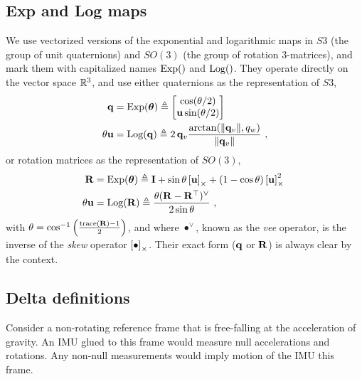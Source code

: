 \subsection{Exp and Log maps}

We use vectorized versions of the exponential and logarithmic maps in $S3$ (the group of unit quaternions) and $SO(3)$ (the group of rotation 3-matrices), and mark them with capitalized names $\operatorname*{Exp}()$ and $\operatorname*{Log}()$. They operate directly on the vector space ${\mathbb R}^3$, and use either quaternions as the representation of $S3$,
%
\begin{subequations}
\begin{align}
{\bf q}
&= \operatorname*{Exp}({{\bm \theta}}) \triangleq \begin{bmatrix}
\cos(\theta/2) \\ {\bf u}\sin(\theta/2)
\end{bmatrix}\\ 
\theta{\bf u} &= \operatorname*{Log}({\bf q}) \triangleq 2\,{{\bf q}_v}\frac{\arctan({{\left\|{{\bf q}_v}\right\|},q_w})}{{\left\|{{\bf q}_v}\right\|}}
~,
\end{align}
\end{subequations}
%
or rotation matrices as the representation of $SO(3)$, 
%
\begin{subequations}
\begin{align}
{\bf R}
&= \operatorname*{Exp}({{\bm \theta}}) \triangleq {\bf I} + \sin\theta\left[{\bf u}\right]_\times + (1-\cos\theta)\left[{\bf u}\right]_\times^2~ \label{equ:rodrigues} \\ 
\theta{\bf u} &= \operatorname*{Log}({\bf R}) \triangleq \frac{\theta({\bf R}-{\bf R}^{\top})^\vee}{2\sin\theta} 
~,
\end{align}
\end{subequations}
%
with $\theta=\cos^{-1}\left(\frac{\operatorname*{trace}({\bf R})-1}{2}\right)$,
and where $\bullet^\vee$, known as the \emph{vee} operator, is the inverse of the \emph{skew} operator $\left[\bullet\right]_\times$. 
Their exact form (${\bf q}$ or ${\bf R}$) is always clear by the context.





\subsection{Delta definitions}

Consider a non-rotating reference frame that is free-falling at the acceleration of gravity. An IMU glued to this frame would measure null accelerations and rotations. Any non-null measurements would imply motion of the IMU \wrt this frame.

